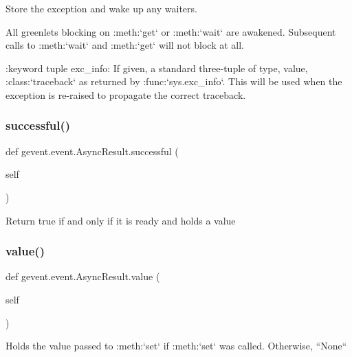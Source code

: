 \begin{DoxyVerb}Store the exception and wake up any waiters.

All greenlets blocking on :meth:`get` or :meth:`wait` are awakened.
Subsequent calls to :meth:`wait` and :meth:`get` will not block at all.

:keyword tuple exc_info: If given, a standard three-tuple of type, value, :class:`traceback`
    as returned by :func:`sys.exc_info`. This will be used when the exception
    is re-raised to propagate the correct traceback.
\end{DoxyVerb}
 \mbox{\label{classgevent_1_1event_1_1_async_result_a4fcee8b446a492d540d813c107b75ae6}} 
\subsubsection{\texorpdfstring{successful()}{successful()}}
{\footnotesize\ttfamily def gevent.\+event.\+Async\+Result.\+successful (\begin{DoxyParamCaption}\item[{}]{self }\end{DoxyParamCaption})}

\begin{DoxyVerb}Return true if and only if it is ready and holds a value\end{DoxyVerb}
 \mbox{\label{classgevent_1_1event_1_1_async_result_a0837f2c7d2b1ef963978846c46606abe}} 
\subsubsection{\texorpdfstring{value()}{value()}}
{\footnotesize\ttfamily def gevent.\+event.\+Async\+Result.\+value (\begin{DoxyParamCaption}\item[{}]{self }\end{DoxyParamCaption})}

\begin{DoxyVerb}Holds the value passed to :meth:`set` if :meth:`set` was called. Otherwise,
``None``
\end{DoxyVerb}
 \mbox{\label{classgevent_1_1event_1_1_async_result_adce89ba3e726e21dd67a10047b8e70c1}} 
